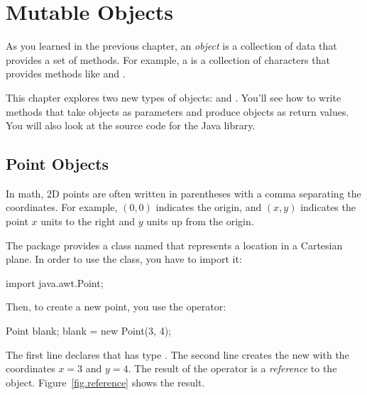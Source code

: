 \chapter{Mutable Objects}
\label{mutable-objects}
\label{mutable}


As you learned in the previous chapter, an {\em object} is a collection of data that provides a set of methods.
For example, a  is a collection of characters that provides methods like  and .

This chapter explores two new types of objects:  and .
You'll see how to write methods that take objects as parameters and produce objects as return values.
You will also look at the source code for the Java library.


\section{Point Objects}
\label{mutable-objects_point-objects}
\label{point}


In math, 2D points are often written in parentheses with a comma separating the coordinates.
For example, $(0,0)$ indicates the origin, and $(x,y)$ indicates the point $x$ units to the right and $y$ units up from the origin.



The  package provides a class named  that represents a location in a Cartesian plane.
In order to use the  class, you have to import it:

\begin{code}
import java.awt.Point;
\end{code}


Then, to create a new point, you use the  operator:

\begin{code}
Point blank;
blank = new Point(3, 4);
\end{code}


The first line declares that  has type .
The second line creates the new  with the coordinates $x=3$ and $y=4$.
The result of the  operator is a {\em reference} to the object.
Figure~\ref{fig.reference} shows the result.

